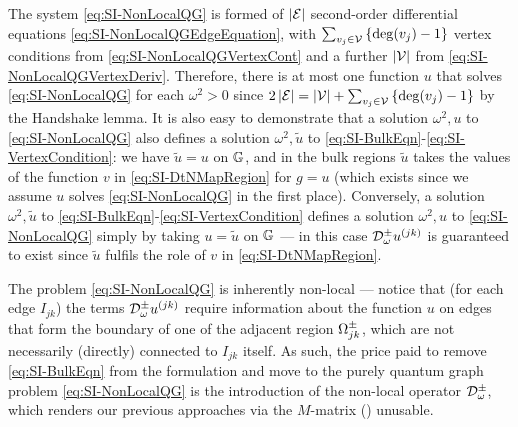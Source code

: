 The system \eqref{eq:SI-NonLocalQG} is formed of $\left\lvert \mathcal{E} \right\rvert$ second-order differential equations \eqref{eq:SI-NonLocalQGEdgeEquation}, with $\sum_{v_j\in\mathcal{V}}\left\{ \deg(v_j)-1 \right\}$ vertex conditions from \eqref{eq:SI-NonLocalQGVertexCont} and a further $\left\lvert \mathcal{V} \right\rvert$ from \eqref{eq:SI-NonLocalQGVertexDeriv}.
Therefore, there is at most one function $u$ that solves \eqref{eq:SI-NonLocalQG} for each $\omega^2>0$ since $2\left\lvert \mathcal{E} \right\rvert = \left\lvert \mathcal{V} \right\rvert + \sum_{v_j\in\mathcal{V}}\left\{ \deg(v_j)-1 \right\}$ by the Handshake lemma.
It is also easy to demonstrate that a solution $\omega^2, u$ to \eqref{eq:SI-NonLocalQG} also defines a solution $\omega^2, \tilde{u}$ to \eqref{eq:SI-BulkEqn}-\eqref{eq:SI-VertexCondition}: we have $\tilde{u}=u$ on $\mathbb{G}$, and in the bulk regions $\tilde{u}$ takes the values of the function $v$ in \eqref{eq:SI-DtNMapRegion} for $g=u$ (which exists since we assume $u$ solves \eqref{eq:SI-NonLocalQG} in the first place).
Conversely, a solution $\omega^2, \tilde{u}$ to \eqref{eq:SI-BulkEqn}-\eqref{eq:SI-VertexCondition} defines a solution $\omega^2, u$ to \eqref{eq:SI-NonLocalQG} simply by taking $u = \tilde{u}$ on $\mathbb{G}$ --- in this case $\mathcal{D}^{\pm}_\omega u^{(jk)}$ is guaranteed to exist since $\tilde{u}$ fulfils the role of $v$ in \eqref{eq:SI-DtNMapRegion}.

The problem \eqref{eq:SI-NonLocalQG} is inherently non-local --- notice that (for each edge $I_{jk}$) the terms $\mathcal{D}^{\pm}_\omega u^{(jk)}$ require information about the function $u$ on edges that form the boundary of one of the adjacent region $\Omega_{jk}^{\pm}$, which are not necessarily (directly) connected to $I_{jk}$ itself.
As such, the price paid to remove \eqref{eq:SI-BulkEqn} from the formulation and move to the purely quantum graph problem \eqref{eq:SI-NonLocalQG} is the introduction of the non-local operator $\mathcal{D}^{\pm}_\omega$, which renders our previous approaches via the $M$-matrix () unusable.